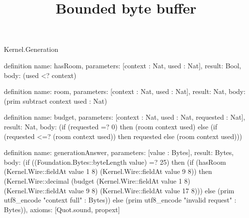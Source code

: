 \begin{lexlean}{Kernel.Generation}
\title{Bounded byte buffer}
\begin{semanticmodule}
definition{
  name: hasRoom,
  parameters: [context : Nat, used : Nat],
  result: Bool,
  body: (used <? context)
}

definition{
  name: room,
  parameters: [context : Nat, used : Nat],
  result: Nat,
  body: (prim subtract context used : Nat)
}

definition{
  name: budget,
  parameters: [context : Nat, used : Nat, requested : Nat],
  result: Nat,
  body: (if (requested =? 0) then (room context used) else (if (requested <=? (room context used)) then requested else (room context used)))
}

definition{
  name: generationAnswer,
  parameters: [value : Bytes],
  result: Bytes,
  body: (if ((Foundation.Bytes::byteLength value) =? 25) then (if (hasRoom (Kernel.Wire::fieldAt value 1 8) (Kernel.Wire::fieldAt value 9 8)) then (Kernel.Wire::decimal (budget (Kernel.Wire::fieldAt value 1 8) (Kernel.Wire::fieldAt value 9 8) (Kernel.Wire::fieldAt value 17 8))) else (prim utf8_encode "context full" : Bytes)) else (prim utf8_encode "invalid request" : Bytes)),
  axioms: [Quot.sound, propext]
}
\end{semanticmodule}
\end{lexlean}
